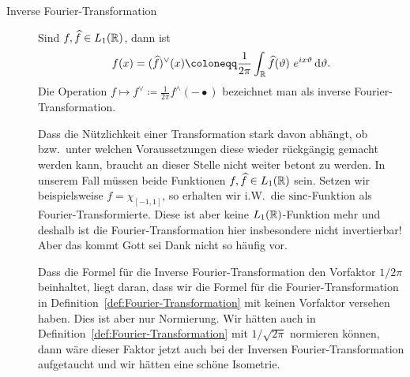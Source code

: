 \begin{remark}
\begin{description}
		\item [Inverse Fourier-Transformation] Sind $ f, \widehat{f} \in L_{1}(\mathbb{R}) $, dann ist
		\[
  		f(x) = (\widehat{f})^{\vee}(x) \coloneqq 
    		\frac{1}{2\pi} \int_{\R} \widehat{f}(\vartheta) \ e^{i x \vartheta} \dif \vartheta.
		\]
		Die Operation $ f \mapsto f^{\vee} \coloneqq \frac{1}{2\pi} f^{\wedge}(-\bullet) $ bezeichnet
		man als inverse Fourier-Transformation. 
		
		Dass die Nützlichkeit einer Transformation stark
		davon abhängt, ob bzw.\ unter welchen Voraussetzungen diese wieder rückgängig gemacht werden 
		kann, braucht an dieser Stelle nicht weiter betont zu werden. In unserem Fall müssen beide
		Funktionen $ f, \widehat{f} \in L_{1}(\mathbb{R}) $ sein. Setzen wir beispielsweise
		$ f = \chi_{[-1,1]} $, so erhalten wir i.W.\ die $ \operatorname{sinc} $-Funktion als Fourier-Transformierte.
		Diese ist aber keine $ L_{1}(\mathbb{R}) $-Funktion mehr und deshalb ist die Fourier-Transformation hier
		insbesondere nicht invertierbar! Aber das kommt Gott sei Dank nicht so häufig vor.
		
		Dass die Formel für die Inverse Fourier-Transformation den Vorfaktor $ 1 / 2\pi $ beinhaltet,
		liegt daran, dass wir die Formel für die Fourier-Transformation in 
		Definition~\ref{def:Fourier-Transformation} mit keinen Vorfaktor versehen haben. Dies ist aber 
		nur Normierung. Wir hätten auch in Definition~\ref{def:Fourier-Transformation} mit
		$ 1 / \sqrt{2\pi} $ normieren können, dann wäre dieser Faktor jetzt auch bei der Inversen
		Fourier-Transformation aufgetaucht und wir hätten eine schöne Isometrie.
	\end{description}
\end{remark}

